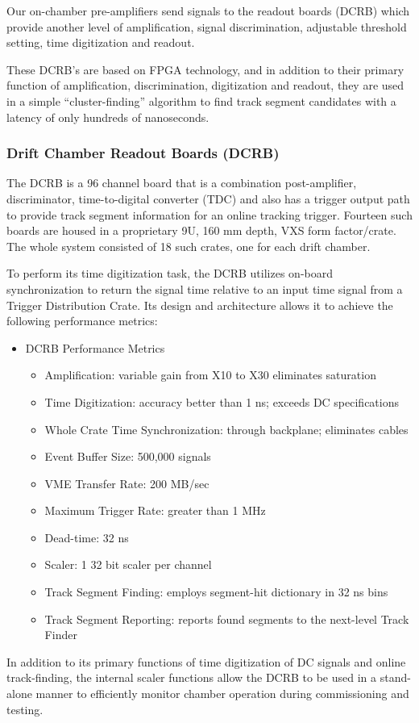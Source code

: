Our on-chamber 
pre-amplifiers send signals to the readout boards (DCRB) 
which provide another level of amplification, 
signal discrimination, adjustable threshold setting, time digitization
and readout. 

These DCRB's are based on FPGA technology, and in addition to
their primary function of amplification, discrimination, digitization
and readout, they are used in a simple ``cluster-finding'' algorithm
to find track segment candidates with a latency of only hundreds
of nanoseconds.

\subsubsection{Drift Chamber Readout Boards (DCRB)}

The DCRB is a 96 channel board that is a combination post-amplifier,
discriminator, time-to-digital converter (TDC) and also has a trigger
output path to provide track segment information for an online tracking trigger.
Fourteen such boards are housed in
a proprietary 9U, 160 mm depth, VXS form factor/crate.
The whole system consisted of 18 such crates, one for each drift chamber.

To perform its time digitization task, the DCRB utilizes on-board synchronization to
return the signal time relative to an input time signal from  a Trigger Distribution
Crate.
Its design and architecture
allows it to achieve the following performance metrics:
\begin{itemize}
\item DCRB Performance Metrics
\begin{itemize}
\item Amplification: variable gain from X10 to X30 eliminates saturation
\item Time Digitization: accuracy better than 1 ns; exceeds DC specifications
\item Whole Crate Time Synchronization: through backplane; eliminates cables
\item Event Buffer Size: 500,000 signals
\item VME Transfer Rate: 200 MB/sec
\item Maximum Trigger Rate: greater than 1 MHz
\item Dead-time: 32 ns
\item Scaler: 1 32 bit scaler per channel
\item Track Segment Finding: employs segment-hit dictionary in 32 ns bins
\item Track Segment Reporting: reports found segments to the next-level Track Finder
\end{itemize}
\end{itemize}

In addition to its primary functions of time digitization of DC signals and online
track-finding, the internal scaler functions allow the DCRB to be used in 
a stand-alone manner to efficiently monitor chamber operation during commissioning
and testing.

